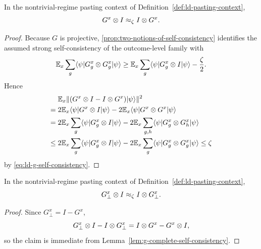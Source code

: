 \begin{lemma}\label{lem:g-complete-self-consistency}
	\leanok
	In the nontrivial-regime pasting context of Definition~\ref{def:ld-pasting-context},
	\[
		G^x \otimes I \approx_\zeta I \otimes G^x.
	\]
\end{lemma}
\begin{proof}
	\leanok
	Because $G$ is projective, \ref{prop:two-notions-of-self-consistency} identifies the assumed strong self-consistency of the outcome-level family with
	\begin{equation}\label{eq:ld-g-self-consistency}
		\mathbb{E}_x \sum_g \langle \psi \rvert G_g^x \otimes G_g^x \lvert \psi \rangle
		\ge
		\mathbb{E}_x \sum_g \langle \psi \rvert G_g^x \otimes I \lvert \psi \rangle - \frac{\zeta}{2}.
	\end{equation}
	Hence
	\begin{align*}
		      & \mathbb{E}_x \|(G^x\otimes I - I\otimes G^x)\lvert \psi \rangle\|^2                                                              \\
		={}   & 2\mathbb{E}_x \langle \psi \rvert G^x \otimes I \lvert \psi \rangle - 2\mathbb{E}_x \langle \psi \rvert G^x \otimes G^x \lvert \psi \rangle                         \\
		={}   & 2\mathbb{E}_x \sum_g \langle \psi \rvert G_g^x \otimes I \lvert \psi \rangle - 2\mathbb{E}_x \sum_{g,h} \langle \psi \rvert G_g^x \otimes G_h^x \lvert \psi \rangle \\
		\le{} & 2\mathbb{E}_x \sum_g \langle \psi \rvert G_g^x \otimes I \lvert \psi \rangle - 2\mathbb{E}_x \sum_g \langle \psi \rvert G_g^x \otimes G_g^x \lvert \psi \rangle
		\le \zeta
	\end{align*}
	by \ref{eq:ld-g-self-consistency}.
\end{proof}

\begin{corollary}\label{cor:g-bot-self-consistency}
	\leanok
	In the nontrivial-regime pasting context of Definition~\ref{def:ld-pasting-context},
	\[
		G_\bot^x \otimes I \approx_\zeta I \otimes G_\bot^x.
	\]
\end{corollary}
\begin{proof}
	\leanok
	Since $G_\bot^x = I-G^x$,
	\[
		G_\bot^x \otimes I - I \otimes G_\bot^x = I \otimes G^x - G^x \otimes I,
	\]
	so the claim is immediate from Lemma~\ref{lem:g-complete-self-consistency}.
\end{proof}

